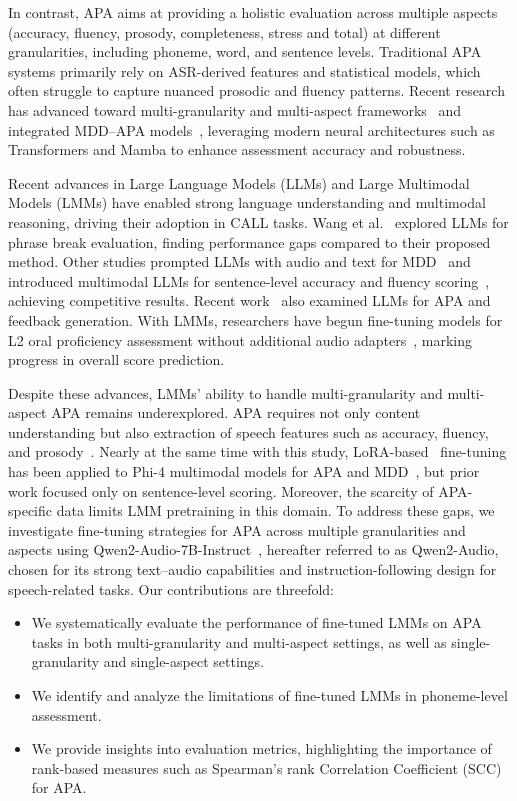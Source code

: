 \documentclass{article}
\begin{document}
In contrast, APA aims at providing a holistic evaluation across multiple aspects (accuracy, fluency, prosody, completeness, stress and total) at different granularities, including phoneme, word, and sentence levels. Traditional APA systems primarily rely on ASR-derived features and statistical models, which often struggle to capture nuanced prosodic and fluency patterns. Recent research has advanced toward multi-granularity and multi-aspect frameworks~\cite{Lin2020PA,Gong2022GOPT,Chao20233MH,Cincarek2009PA,Do2023Hierarchical} and integrated MDD–APA models~\cite{Ryu2023Joint,Chao2025HMamba}, leveraging modern neural architectures such as Transformers and Mamba to enhance assessment accuracy and robustness.

Recent advances in Large Language Models (LLMs) and Large Multimodal Models (LMMs) have enabled strong language understanding and multimodal reasoning, driving their adoption in CALL tasks. Wang et al.~\cite{Wang2023Assessing} explored LLMs for phrase break evaluation, finding performance gaps compared to their proposed method. Other studies prompted LLMs with audio and text for MDD~\cite{Wu2024Prompting} and introduced multimodal LLMs for sentence-level accuracy and fluency scoring~\cite{Fu2024LLM}, achieving competitive results. Recent work~\cite{Wang2025Exploring,NatarajanBalaji2025Leveraging} also examined LLMs for APA and feedback generation. With LMMs, researchers have begun fine-tuning models for L2 oral proficiency assessment without additional audio adapters~\cite{Ma2025Assessment}, marking progress in overall score prediction.

Despite these advances, LMMs’ ability to handle multi-granularity and multi-aspect APA remains underexplored. APA requires not only content understanding but also extraction of speech features such as accuracy, fluency, and prosody~\cite{Wang2025Exploring}. Nearly at the same time with this study, LoRA-based~\cite{Hu2021LoRA} fine-tuning has been applied to Phi-4 multimodal models for APA and MDD~\cite{Ahn2025English}, but prior work focused only on sentence-level scoring. Moreover, the scarcity of APA-specific data limits LMM pretraining in this domain. To address these gaps, we investigate fine-tuning strategies for APA across multiple granularities and aspects using Qwen2-Audio-7B-Instruct~\cite{Chu2024Qwen2Audio}, hereafter referred to as Qwen2-Audio, chosen for its strong text–audio capabilities and instruction-following design for speech-related tasks. Our contributions are threefold:

\begin{itemize}[label=\textbullet, itemsep=0.3em, parsep=0.1em, topsep=0em, leftmargin=2em]
  \item We systematically evaluate the performance of fine-tuned LMMs on APA tasks in both multi-granularity and multi-aspect settings, as well as single-granularity and single-aspect settings.
  \item We identify and analyze the limitations of fine-tuned LMMs in phoneme-level assessment.
  \item We provide insights into evaluation metrics, highlighting the importance of rank-based measures such as Spearman’s rank Correlation Coefficient (SCC) for APA.
\end{itemize}
\end{document}
